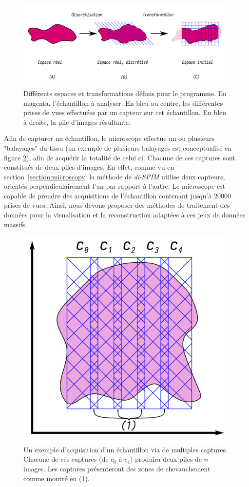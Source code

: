 {{        \begin{figure}[h]
            \centering
            \includegraphics[width=\linewidth]{img/spaces_transfo_1_updated.png}
            \captionsetup{width=.8\linewidth}
            \caption{Différents espaces et transformations définis pour le programme. En magenta, l'échantillon à analyser. En bleu au centre, les différentes prises de vues effectuées par un capteur sur cet échantillon. En bleu à droite, la pile d'images résultante.}
            \label{img:spaces_real_initial}
        \end{figure}

        Afin de capturer un échantillon, le microscope effectue un ou plusieurs "balayages" du tissu (un exemple de plusieurs balayages est conceptualisé en figure \ref{img:multiple_image_captures}), afin de acquérir la totalité de celui ci. Chacune de ces captures sont constitués de deux piles d'images. En effet, comme vu en section~\ref{section:microscopy} la méthode de \textit{di-SPIM} utilise deux capteurs, orientés perpendiculairement l'un par rapport à l'autre. Le microscope est capable de prendre des acquisitions de l'échantillon contenant jusqu'à 20000 prises de vues. Ainsi, nous devons proposer des méthodes de traitement des données pour la visualisation et la reconstruction adaptées à ces jeux de données massifs.

        \begin{figure}[h]
            \centering
            \includegraphics[width=.5\linewidth]{img/multiple_captures.png}
            \captionsetup{width=.7\linewidth}
            \caption{Un exemple d'acquisition d'un échantillon via de multiples captures. Chacune de ces captures (de $c_0$ à $c_4$) produira deux piles de $n$ images. Les captures présenteront des zones de chevauchement comme montré en (1).}
            \label{img:multiple_image_captures}
        \end{figure}

}}
